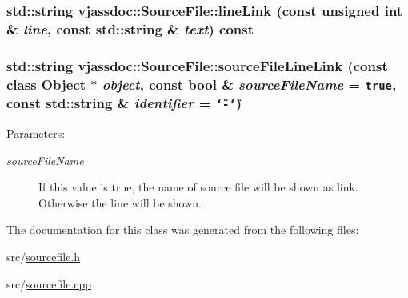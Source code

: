 \hypertarget{classvjassdoc_1_1SourceFile_b470fdc8f3bb45197ba3ca3fd7aefbea}{
\subsubsection{\setlength{\rightskip}{0pt plus 5cm}std::string vjassdoc::SourceFile::lineLink (const unsigned int \& {\em line}, const std::string \& {\em text}) const}}
\label{classvjassdoc_1_1SourceFile_b470fdc8f3bb45197ba3ca3fd7aefbea}


\hypertarget{classvjassdoc_1_1SourceFile_5442b71bdf46f52e3aec90257e6a3dcb}{
\subsubsection{\setlength{\rightskip}{0pt plus 5cm}std::string vjassdoc::SourceFile::sourceFileLineLink (const class {\bf Object} $\ast$ {\em object}, const bool \& {\em sourceFileName} = {\tt true}, const std::string \& {\em identifier} = {\tt \char`\"{}-\char`\"{}})}}
\label{classvjassdoc_1_1SourceFile_5442b71bdf46f52e3aec90257e6a3dcb}


\begin{Desc}
\item[Parameters:]
\begin{description}
\item[{\em sourceFileName}]If this value is true, the name of source file will be shown as link. Otherwise the line will be shown. \end{description}
\end{Desc}


The documentation for this class was generated from the following files:\begin{CompactItemize}
\item 
src/\hyperlink{sourcefile_8h}{sourcefile.h}\item 
src/\hyperlink{sourcefile_8cpp}{sourcefile.cpp}\end{CompactItemize}
